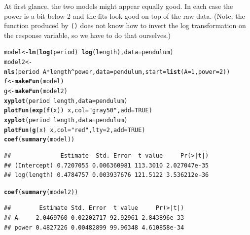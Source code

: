 \documentclass[twoside]{book}\usepackage[]{graphicx}\usepackage[]{xcolor}
\makeatletter
\newcommand{\hlnum}[1]{\textcolor[rgb]{0.686,0.059,0.569}{#1}}%
\newcommand{\hlstr}[1]{\textcolor[rgb]{0.192,0.494,0.8}{#1}}%
\newcommand{\hlopt}[1]{\textcolor[rgb]{0,0,0}{#1}}%
\newcommand{\hlstd}[1]{\textcolor[rgb]{0.345,0.345,0.345}{#1}}%
\newcommand{\hlkwb}[1]{\textcolor[rgb]{0.69,0.353,0.396}{#1}}%
\newcommand{\hlkwc}[1]{\textcolor[rgb]{0.333,0.667,0.333}{#1}}%
\newcommand{\hlkwd}[1]{\textcolor[rgb]{0.737,0.353,0.396}{\textbf{#1}}}%
\newenvironment{kframe}{%
 \def\at@end@of@kframe{}%
 \ifinner\ifhmode%
  \def\at@end@of@kframe{\end{minipage}}%
  \begin{minipage}{\columnwidth}%
 \fi\fi%
 \def\FrameCommand##1{\hskip\@totalleftmargin \hskip-\fboxsep
 \colorbox{shadecolor}{##1}\hskip-\fboxsep
     \hskip-\linewidth \hskip-\@totalleftmargin \hskip\columnwidth}%
 \MakeFramed {\advance\hsize-\width
   \@totalleftmargin\z@ \linewidth\hsize
   \@setminipage}}%
 {\par\unskip\endMakeFramed%
 \at@end@of@kframe}
\newenvironment{knitrout}{}{} %
\newcommand{\Rindex}[1]{\index{\texttt{#1}}}
\newcommand{\function}[1]{{\color{purple!75!blue}\texttt{\StrSubstitute{#1}{()}{}()}}\Rindex{#1}}
\makeatother
\begin{document}
\begin{solution}
	At first glance, the two models might appear equally good.  In each case the 
	power is a bit below 2 and the fits look good on top of the raw data.  (Note: the 
	function produced by \function{makeFun()} does not know how to invert the log
	transformation on the response variable, so we have to do that ourselves.)
\begin{knitrout}
\color{fgcolor}\begin{kframe}
\begin{alltt}
\hlstd{model} \hlkwb{<-} \hlkwd{lm}\hlstd{(}\hlkwd{log}\hlstd{(period)} \hlopt{~} \hlkwd{log}\hlstd{(length),} \hlkwc{data} \hlstd{= pendulum)}
\hlstd{model2} \hlkwb{<-} \hlkwd{nls}\hlstd{(period} \hlopt{~} \hlstd{A} \hlopt{*} \hlstd{length}\hlopt{^}\hlstd{power,} \hlkwc{data} \hlstd{= pendulum,} \hlkwc{start} \hlstd{=} \hlkwd{list}\hlstd{(}\hlkwc{A} \hlstd{=} \hlnum{1}\hlstd{,} \hlkwc{power} \hlstd{=} \hlnum{2}\hlstd{))}
\hlstd{f} \hlkwb{<-} \hlkwd{makeFun}\hlstd{(model)}
\hlstd{g} \hlkwb{<-} \hlkwd{makeFun}\hlstd{(model2)}
\hlkwd{xyplot}\hlstd{(period} \hlopt{~} \hlstd{length,} \hlkwc{data} \hlstd{= pendulum)}
\hlkwd{plotFun}\hlstd{(}\hlkwd{exp}\hlstd{(}\hlkwd{f}\hlstd{(x))} \hlopt{~} \hlstd{x,} \hlkwc{col} \hlstd{=} \hlstr{"gray50"}\hlstd{,} \hlkwc{add} \hlstd{=} \hlnum{TRUE}\hlstd{)}
\hlkwd{xyplot}\hlstd{(period} \hlopt{~} \hlstd{length,} \hlkwc{data} \hlstd{= pendulum)}
\hlkwd{plotFun}\hlstd{(}\hlkwd{g}\hlstd{(x)} \hlopt{~} \hlstd{x,} \hlkwc{col} \hlstd{=} \hlstr{"red"}\hlstd{,} \hlkwc{lty} \hlstd{=} \hlnum{2}\hlstd{,} \hlkwc{add} \hlstd{=} \hlnum{TRUE}\hlstd{)}
\hlkwd{coef}\hlstd{(}\hlkwd{summary}\hlstd{(model))}
\end{alltt}
\begin{verbatim}
##              Estimate  Std. Error  t value     Pr(>|t|)
## (Intercept) 0.7207055 0.006360981 113.3010 2.027047e-35
## log(length) 0.4784757 0.003937676 121.5122 3.536212e-36
\end{verbatim}
\begin{alltt}
\hlkwd{coef}\hlstd{(}\hlkwd{summary}\hlstd{(model2))}
\end{alltt}
\begin{verbatim}
##        Estimate Std. Error  t value     Pr(>|t|)
## A     2.0469760 0.02202717 92.92961 2.843896e-33
## power 0.4827226 0.00482899 99.96348 4.610858e-34
\end{verbatim}
\end{kframe}


\end{knitrout}
\end{solution}
\end{document}

